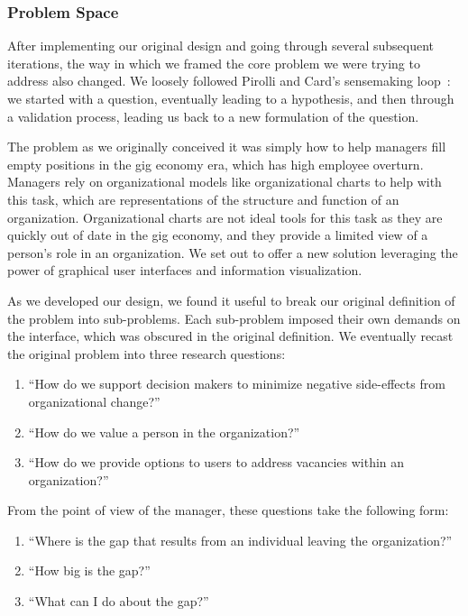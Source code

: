 \documentclass[journal]{vgtc}                %
\begin{document}
\subsubsection{Problem Space}
\label{sec:problem}
After implementing our original design and going through several subsequent iterations, the way in which we framed the core problem we were trying to address also changed. We loosely followed Pirolli and Card's sensemaking loop~\cite{pirolli2005sensemaking}: we started with a question, eventually leading to a hypothesis, and then through a validation process, leading us back to a new formulation of the question.  

The problem as we originally conceived it was simply how to help managers fill empty positions in the gig economy era, which has high employee overturn. Managers rely on organizational models like organizational charts to help with this task, which are representations of the structure and function of an organization. Organizational charts are not ideal tools for this task as they are quickly out of date in the gig economy, and they provide a limited view of a person's role in an organization. We set out to offer a new solution leveraging the power of graphical user interfaces and information visualization. 

As we developed our design, we found it useful to break our original definition of the problem into sub-problems. Each sub-problem imposed their own demands on the interface, which was obscured in the original definition. We eventually recast the original problem into three research questions: 

\begin{enumerate}
\item “How do we support decision makers to minimize negative side-effects from organizational change?”
\item “How do we value a person in the organization?”
\item “How do we provide options to users to address vacancies within an organization?”
\end{enumerate}

From the point of view of the manager, these questions take the following form: 

\begin{enumerate}
\item ``Where is the gap that results from an individual leaving the organization?''
\item ``How big is the gap?''
\item ``What can I do about the gap?''
\end{enumerate}
\end{document}
